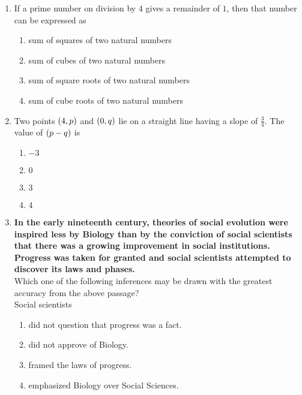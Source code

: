 \documentclass[journal,12pt,twocolumn]{IEEEtran}
\theoremstyle{remark}
\begin{document}
\begin{enumerate}[start=53]
    \item If a prime number on division by $4$ gives a remainder of $1$, then that number can be expressed as
    \begin{enumerate}
        \item sum of squares of two natural numbers
        \item sum of cubes of two natural numbers
        \item sum of square roots of two natural numbers
        \item sum of cube roots of two natural numbers
    \end{enumerate}

    \item Two points $\left(4, p\right)$ and $\left(0, q\right)$ lie on a straight line having a slope of $\frac{3}{4}$. The value of $\left(p - q\right)$ is
    \begin{enumerate}
        \item $-3$
        \item $0$
        \item $3$
        \item $4$
    \end{enumerate}

    \item \textbf{In the early nineteenth century, theories of social evolution were inspired less by Biology than by the conviction of social scientists that there was a growing improvement in social institutions. Progress was taken for granted and social scientists attempted to discover its laws and phases.} \\
    Which one of the following inferences may be drawn with the greatest accuracy from the above passage? \\
    Social scientists
    \begin{enumerate}
        \item did not question that progress was a fact.
        \item did not approve of Biology.
        \item framed the laws of progress.
        \item emphasized Biology over Social Sciences.
    \end{enumerate}



 
\end{enumerate}
\end{document}
